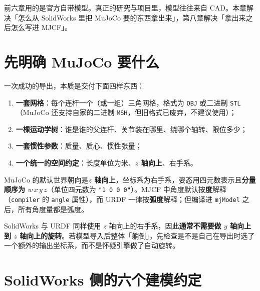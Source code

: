 
前六章用的是官方自带模型。真正的研究与项目里，模型往往来自 CAD。本章解决「怎么从 SolidWorks 里把 MuJoCo 要的东西拿出来」，第八章解决「拿出来之后怎么写进 MJCF」。

\section{先明确 MuJoCo 要什么}

一次成功的导出，本质是交付下面四样东西：

\begin{enumerate}
	\item \textbf{一套网格}：每个连杆一个（或一组）三角网格，格式为 \texttt{OBJ} 或二进制 \texttt{STL}（MuJoCo 还支持自家的二进制 \texttt{MSH}，但旧格式已废弃，不建议使用）；
	\item \textbf{一棵运动学树}：谁是谁的父连杆、关节装在哪里、绕哪个轴转、限位多少；
	\item \textbf{一套惯性参数}：质量、质心、惯性张量；
	\item \textbf{一个统一的空间约定}：长度单位为米、\textbf{$z$ 轴向上}、右手系。
\end{enumerate}

\begin{definition}
	MuJoCo 的默认世界朝向是\textbf{$z$ 轴向上}，坐标系为右手系，姿态用四元数表示且\textbf{分量顺序为 $w\,x\,y\,z$}（单位四元数为 \texttt{"1 0 0 0"}）。MJCF 中角度默认按\textbf{度}解释（\texttt{compiler} 的 \texttt{angle} 属性），而 URDF 一律按\textbf{弧度}解释；但编译进 \texttt{mjModel} 之后，所有角度量都是弧度。
	\label{def:MuJoCo:空间约定}
\end{definition}

\begin{note}
	SolidWorks 与 URDF 同样使用 $z$ 轴向上的右手系，因此\textbf{通常不需要做 $y$ 轴向上到 $z$ 轴向上的旋转}。若模型导入后整体「躺倒」，先检查是不是自己在导出时选了一个额外的输出坐标系，而不是怀疑引擎做了自动旋转。
\end{note}

\section{SolidWorks 侧的六个建模约定}

